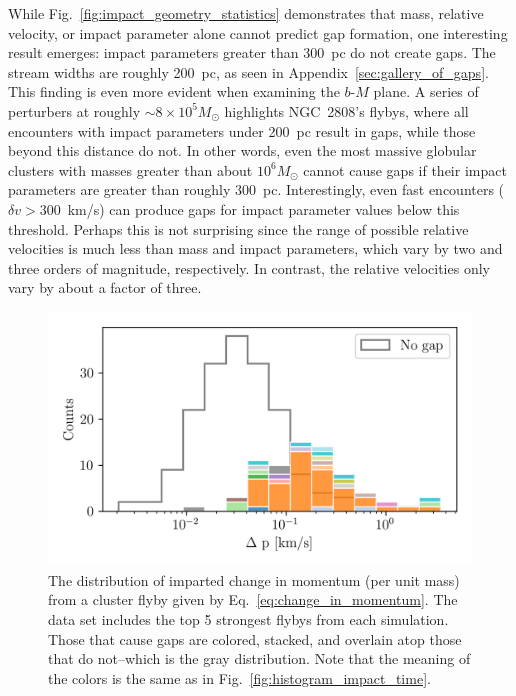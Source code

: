 \documentclass{aa}
\begin{document}
      
  
    While Fig.~\ref{fig:impact_geometry_statistics} demonstrates that mass, relative velocity, or impact parameter alone cannot predict gap formation, one interesting result emerges: impact parameters greater than 300~pc do not create gaps. The stream widths are roughly 200~pc, as seen in Appendix~\ref{sec:gallery_of_gaps}. This finding is even more evident when examining the $b$-$M$ plane. A series of perturbers at roughly $\sim8 \times 10^5 M_\odot$ highlights NGC~2808's flybys, where all encounters with impact parameters under 200~pc result in gaps, while those beyond this distance do not. In other words, even the most massive globular clusters with masses greater than about $10^6 M_\odot$ cannot cause gaps if their impact parameters are greater than roughly $300$~pc. Interestingly, even fast encounters ($\delta v > 300$~km/s) can produce gaps for impact parameter values below this threshold. Perhaps this is not surprising since the range of possible relative velocities is much less than mass and impact parameters, which vary by two and three orders of magnitude, respectively. In contrast, the relative velocities only vary by about a factor of three.

    \begin{figure}
      \centering
      \includegraphics[width=1\linewidth]{impact_geometry_statistics_deltaP.png}
      \caption{The distribution of imparted change in momentum (per unit mass) from a cluster flyby given by Eq.~\ref{eq:change_in_momentum}. The data set includes the top 5 strongest flybys from each simulation. Those that cause gaps are colored, stacked, and overlain atop those that do not--which is the gray distribution. Note that the meaning of the colors is the same as in Fig.~\ref{fig:histogram_impact_time}.}
      \label{fig:deltap}
    \end{figure}
      
\end{document}
